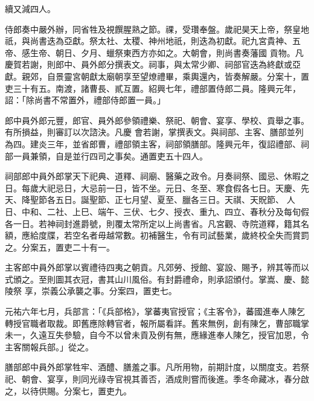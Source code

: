 \begin{pinyinscope}
 續又減四人。



 侍郎奏中嚴外辦，同省牲及視饌腥熟之節。祼，受瓚奉盤。歲祀昊天上帝，祭皇地祇，與尚書迭為亞獻。祭太社、太稷、神州地祇，則迭為初獻。祀九宮貴神、五帝、感生帝、朝日、夕月、蠟祭東西方亦如之。大朝會，則尚書奏藩國
 貢物。凡慶賀若謝，則郎中、員外郎分撰表文。祠事，與太常少卿、祠部官迭為終獻或亞獻。親郊，自景靈宮朝獻太廟朝享至望燎禮畢，乘輿還內，皆奏解嚴。分案十，置吏三十有五。南渡，諸曹長、貳互置。紹興七年，禮部置侍郎二員。隆興元年，詔：「除尚書不常置外，禮部侍郎置一員。」



 郎中員外郎元豐，郎官、員外郎參領禮樂、祭祀、朝會、宴享、學校、貢舉之事。有所損益，則審訂以次諮決。凡慶
 會若謝，掌撰表文。與祠部、主客、膳部並列為四。建炎三年，並省郎曹，禮部領主客，祠部領膳部。隆興元年，復詔禮部、祠部一員兼領，自是並行四司之事矣。通置吏五十四人。



 祠部郎中員外郎掌天下祀典、道釋、祠廟、醫藥之政令。月奏祠祭、國忌、休暇之日。每歲大祀忌日，大忌前一日，皆不坐。元日、冬至、寒食假各七日。天慶、先天、降聖節各五日。誕聖節、正七月望、夏至、臘各三日。天祺、天貺節、
 人日、中和、二社、上巳、端午、三伏、七夕、授衣、重九、四立、春秋分及每旬假各一日。若神祠封進爵號，則覆太常所定以上尚書省。凡宮觀、寺院道釋，籍其名額，應給度牒，若空名者毋越常數。初補醫生，令有司試藝業，歲終校全失而賞罰之。分案五，置吏二十有一。



 主客郎中員外郎掌以賓禮待四夷之朝貢。凡郊勞、授館、宴設、賜予，辨其等而以式頒之。至則圖其衣冠，書其山川風俗。有封爵禮命，則承詔頒付。掌嵩、慶、懿陵祭
 享，崇義公承襲之事。分案四，置吏七。



 元祐六年七月，兵部言：「《兵部格》，掌蕃夷官授官；《主客令》，蕃國進奉人陳乞轉授官職者取裁。即舊應除轉官者，報所屬看詳。舊來無例，創有陳乞，曹部職掌未一，久遠互失參驗，自今不以曾未貢及例有無，應緣進奉人陳乞，授官加恩，令主客關報兵部。」從之。



 膳部郎中員外郎掌牲牢、酒醴、膳羞之事。凡所用物，前期計度，以關度支。若祭祀、朝會、宴享，則同光祿寺官視其善否，酒成則嘗而後進。季冬命藏冰，春分啟之，以待供賜。分案七，置吏九。




\end{pinyinscope}
